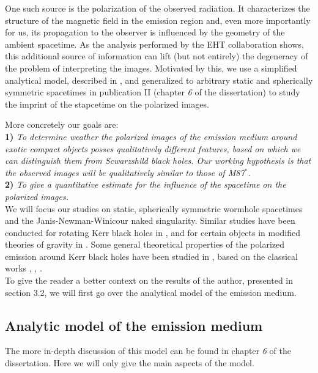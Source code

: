 \documentclass[12pt]{article}
\numberwithin{equation}{section}
\numberwithin{figure}{section}
\begin{document}
	One such source is the polarization of the observed radiation. It characterizes the structure of the magnetic field in the emission region and, even more importantly for us, its propagation to the observer is influenced by the geometry of the ambient spacetime. As the analysis performed by the EHT collaboration shows, this additional source of information can lift (but not entirely) the degeneracy of the problem of interpreting the images. Motivated by this, we use a simplified analytical model, described in \cite{Narayan2021}, and generalized to arbitrary static and spherically symmetric spacetimes in publication II (chapter \emph{6} of the dissertation) to study the imprint of the stapcetime on the polarized images.
	\newpage
	
	More concretely our goals are:\\
	
	\textbf{1)} \emph{To determine weather the polarized images of the emission medium around exotic compact objects posses qualitatively different features, based on which we can distinguish them from Scwarzshild black holes. Our working hypothesis is that the observed images will be qualitatively similar to those of M87$^*$.}\\
	
	\textbf{2)} \emph{To give a quantitative estimate for the influence of the spacetime on the polarized images.}\\
	
	We will focus our studies on static, spherically symmetric wormhole spacetimes and the Janis-Newman-Winicour naked singularity. Similar studies have been conducted for rotating Kerr black holes in \cite{Gelles2021}, and for certain objects in modified theories of gravity in \cite{Qin2021}. Some general theoretical properties of the polarized emission around Kerr black holes have been studied in \cite{Himwich2020}, based on the classical works  \cite{Luminet1979}, \cite{Connors1980}, \cite{Chen1991}.\\
	
	To give the reader a better context on the results of the author, presented in section 3.2, we will first go over the analytical model of the emission medium.
	
	\subsection{Analytic model of the emission medium}
	
	The more in-depth discussion of this model can be found in chapter \emph{6} of the dissertation. Here we will only give the main aspects of the model.\\
	
\end{document}
